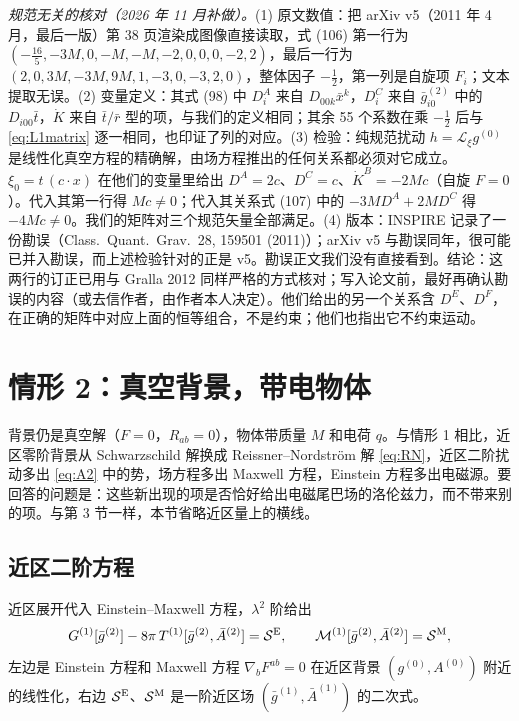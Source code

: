 \documentclass[11pt,a4paper]{ctexart}
\numberwithin{equation}{section}
\begin{document}
\emph{规范无关的核对（2026 年 11 月补做）。}(1) 原文数值：把 arXiv v5（2011 年 4 月，最后一版）第 38 页渲染成图像直接读取，式 (106) 第一行为 $(-\tfrac{16}5,-3M,0,-M,-M,-2,0,0,0,-2,2)$，最后一行为 $(2,0,3M,-3M,9M,1,-3,0,-3,2,0)$，整体因子 $-\tfrac12$，第一列是自旋项 $F_i$；文本提取无误。(2) 变量定义：其式 (98) 中 $D^A_i$ 来自 $D_{00k}\bar x^k$，$D^C_i$ 来自 $\bar g^{(2)}_{i0}$ 中的 $D_{i00}\bar t$，$\dot K$ 来自 $\bar t/\bar r$ 型的项，与我们的定义相同；其余 55 个系数在乘 $-\tfrac12$ 后与 \eqref{eq:L1matrix} 逐一相同，也印证了列的对应。(3) 检验：纯规范扰动 $h=\mathcal L_\xi g^{(0)}$ 是线性化真空方程的精确解，由场方程推出的任何关系都必须对它成立。$\xi_0=t\,(c\cdot x)$ 在他们的变量里给出 $D^A=2c$、$D^C=c$、$\dot K^B=-2Mc$（自旋 $F=0$）。代入其第一行得 $Mc\neq0$；代入其关系式 (107) 中的 $-3MD^A+2MD^C$ 得 $-4Mc\neq0$。我们的矩阵对三个规范矢量全部满足。(4) 版本：INSPIRE 记录了一份勘误（Class.\ Quant.\ Grav.\ 28, 159501 (2011)）；arXiv v5 与勘误同年，很可能已并入勘误，而上述检验针对的正是 v5。勘误正文我们没有直接看到。结论：这两行的订正已用与 Gralla 2012 同样严格的方式核对；写入论文前，最好再确认勘误的内容（或去信作者，由作者本人决定）。他们给出的另一个关系含 $D^E$、$D^F$，在正确的矩阵中对应上面的恒等组合，不是约束；他们也指出它不约束运动。

\section{情形 2：真空背景，带电物体}
\label{sec:L2}

背景仍是真空解（$F=0$，$R_{ab}=0$），物体带质量 $M$ 和电荷 $q$。与情形 1 相比，近区零阶背景从 Schwarzschild 解换成 Reissner--Nordstr\"om 解 \eqref{eq:RN}，近区二阶扰动多出 \eqref{eq:A2} 中的势，场方程多出 Maxwell 方程，Einstein 方程多出电磁源。要回答的问题是：这些新出现的项是否恰好给出电磁尾巴场的洛伦兹力，而不带来别的项。与第 3 节一样，本节省略近区量上的横线。

\subsection{近区二阶方程}
\label{sec:L2eq}

近区展开代入 Einstein--Maxwell 方程，$\lambda^2$ 阶给出
\begin{equation}
G^{(1)}[\bar g^{(2)}]-8\pi\,T^{(1)}[\bar g^{(2)},\bar A^{(2)}]=\mathcal S^{\rm E},\qquad
\mathcal M^{(1)}[\bar g^{(2)},\bar A^{(2)}]=\mathcal S^{\rm M},
\label{eq:L2second}
\end{equation}
左边是 Einstein 方程和 Maxwell 方程 $\nabla_bF^{ab}=0$ 在近区背景 $(g^{(0)},A^{(0)})$ 附近的线性化，右边 $\mathcal S^{\rm E}$、$\mathcal S^{\rm M}$ 是一阶近区场 $(\bar g^{(1)},\bar A^{(1)})$ 的二次式。
\end{document}

